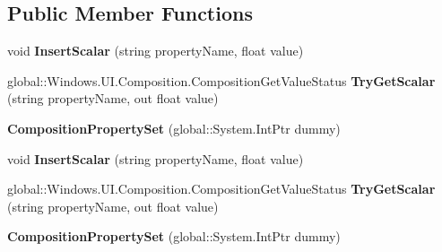 \subsection*{Public Member Functions}
\begin{DoxyCompactItemize}
\item 
\mbox{\label{class_windows_1_1_u_i_1_1_composition_1_1_composition_property_set_abe4cc8bd1cdacfc5561505c7afcedab9}} 
void {\bfseries Insert\+Scalar} (string property\+Name, float value)
\item 
\mbox{\label{class_windows_1_1_u_i_1_1_composition_1_1_composition_property_set_ac649cea8ddd129ed7dba686111ace9a4}} 
global\+::\+Windows.\+U\+I.\+Composition.\+Composition\+Get\+Value\+Status {\bfseries Try\+Get\+Scalar} (string property\+Name, out float value)
\item 
\mbox{\label{class_windows_1_1_u_i_1_1_composition_1_1_composition_property_set_a1ffccc724ef124c5ca089ed009f6185a}} 
{\bfseries Composition\+Property\+Set} (global\+::\+System.\+Int\+Ptr dummy)
\item 
\mbox{\label{class_windows_1_1_u_i_1_1_composition_1_1_composition_property_set_abe4cc8bd1cdacfc5561505c7afcedab9}} 
void {\bfseries Insert\+Scalar} (string property\+Name, float value)
\item 
\mbox{\label{class_windows_1_1_u_i_1_1_composition_1_1_composition_property_set_ac649cea8ddd129ed7dba686111ace9a4}} 
global\+::\+Windows.\+U\+I.\+Composition.\+Composition\+Get\+Value\+Status {\bfseries Try\+Get\+Scalar} (string property\+Name, out float value)
\item 
\mbox{\label{class_windows_1_1_u_i_1_1_composition_1_1_composition_property_set_a1ffccc724ef124c5ca089ed009f6185a}} 
{\bfseries Composition\+Property\+Set} (global\+::\+System.\+Int\+Ptr dummy)
\item 
\mbox{\label{class_windows_1_1_u_i_1_1_composition_1_1_composition_property_set_abe4cc8bd1cdacfc5561505c7afcedab9}} 

\end{DoxyCompactItemize}
